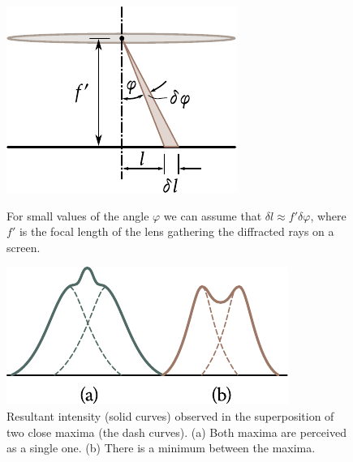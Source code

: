\begin{figure}[!htb]
	\begin{minipage}[t]{0.48\linewidth}
		\begin{center}
			\includegraphics[scale=0.95]{figures/ch_18/fig_18_36.pdf}
            \caption[]{For small values of the angle $\varphi$ we can assume that $\delta{l}\approx f'\delta{\varphi}$, where $f'$ is the focal length of the lens gathering the diffracted rays on a screen.}
			\label{fig:18_36}
		\end{center}
	\end{minipage}
	\hfill{ }%
	\begin{minipage}[t]{0.48\linewidth}
		\begin{center}
			\includegraphics[scale=0.95]{figures/ch_18/fig_18_37.pdf}
			\caption[]{Resultant intensity (solid curves) observed in the superposition of two close maxima (the dash curves).
			(a) Both maxima are perceived as a single one. (b) There is a minimum between the maxima.}
			\label{fig:18_37}
		\end{center}
	\end{minipage}
\vspace{-0.4cm}
\end{figure}

